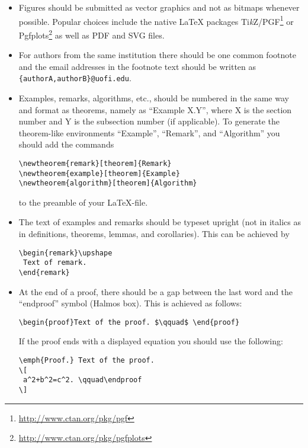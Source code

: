 \documentclass[parskip=half]{scrartcl}
\begin{document}
\begin{itemize}
\item Figures should be submitted as vector graphics and not as bitmaps
  whenever possible. Popular choices include the native \LaTeX{} packages
  Ti\textit{k}Z/PGF\footnote{\url{http://www.ctan.org/pkg/pgf}} or
  Pgfplots\footnote{\url{http://www.ctan.org/pkg/pgfplots}} as well as PDF and
  SVG files.

\item For authors from the same institution there should be one common footnote
  and the email addresses in the footnote text should be written as
  \texttt{\{authorA,authorB\}@uofi.edu}.

%
%
\item Examples, remarks, algorithms, etc., should be numbered in the same way
  and format as theorems, namely as ``Example X.Y'', where X is the section
  number and Y is the subsection number (if applicable). To generate the
  theorem-like environments ``Example'', ``Remark'', and ``Algorithm'' you
  should add the commands
\begin{verbatim}
\newtheorem{remark}[theorem]{Remark}
\newtheorem{example}[theorem]{Example}
\newtheorem{algorithm}[theorem]{Algorithm}
\end{verbatim}
to the preamble of your \LaTeX-file.
%
\item The text of examples and remarks should be typeset upright (not in
  italics as in definitions, theorems, lemmas, and corollaries).  This can be
  achieved by
\begin{verbatim}
\begin{remark}\upshape
 Text of remark.
\end{remark}
\end{verbatim}
%
\item  At the end of a proof, there should be a gap between the last word and
  the ``endproof'' symbol (Halmos box). This is achieved as follows:
\begin{verbatim}
\begin{proof}Text of the proof. $\qquad$ \end{proof}
\end{verbatim}
If the proof ends with a displayed equation you should use the following:
\begin{verbatim}
\emph{Proof.} Text of the proof.
\[
 a^2+b^2=c^2. \qquad\endproof
\]
\end{verbatim}


\end{itemize}
\end{document}
